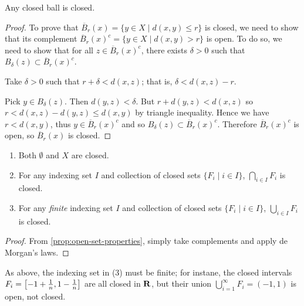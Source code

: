 \begin{proposition}
Any closed ball is closed.
\end{proposition}

\begin{proof}
To prove that $\overline{B}_r(x)=\{y\in X\mid d(x,y)\le r\}$ is closed, we need to show that its complement $\overline{B}_r(x)^c=\{y\in X\mid d(x,y)>r\}$ is open. To do so, we need to show that for all $z\in\overline{B}_r(x)^c$, there exists $\delta>0$ such that $B_\delta(z)\subset\overline{B}_r(x)^c$.

Take $\delta>0$ such that $r+\delta<d(x,z)$; that is, $\delta<d(x,z)-r$.

Pick $y\in B_\delta(z)$. Then $d(y,z)<\delta$. But $r+d(y,z)<d(x,z)$ so $r<d(x,z)-d(y,z)\le d(x,y)$ by triangle inequality. Hence we have $r<d(x,y)$, thus $y\in\overline{B}_r(x)^c$ and so $B_\delta(z)\subset\overline{B}_r(x)^c$. Therefore $\overline{B}_r(x)^c$ is open, so $\overline{B}_r(x)$ is closed.
\end{proof}

\begin{proposition}\label{prop:closed-set-properties}
\begin{enumerate}[label=(\arabic*)]
\item Both $\emptyset$ and $X$ are closed.
\item For any indexing set $I$ and collection of closed sets $\{F_i\mid i\in I\}$, $\bigcap_{i\in I}F_i$ is closed.
\item For any \emph{finite} indexing set $I$ and collection of closed sets $\{F_i\mid i\in I\}$, $\bigcup_{i\in I}F_i$ is closed.
\end{enumerate}
\end{proposition}

\begin{proof}
From \cref{prop:open-set-properties}, simply take complements and apply de Morgan's laws.
\end{proof}

\begin{remark}
As above, the indexing set in (3) must be finite; for instane, the closed intervals $F_i=\left[-1+\frac{1}{n},1-\frac{1}{n}\right]$ are all closed in $\mathbf R$, but their union $\bigcup_{i=1}^\infty F_i=(-1,1)$ is open, not closed.
\end{remark}

